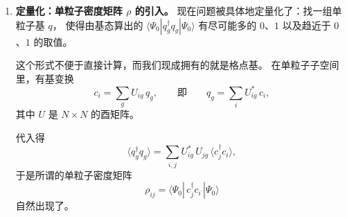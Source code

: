 \documentclass[11pt]{ctexart}
\begin{document}
\begin{enumerate}[leftmargin=2em, itemsep=0.8em]
\textbf{数值示例}：设 $N=4$ 格点、$M=2$ 个无自旋费米子，
在某个 $q$ 基下取归一化态
\[
|\psi\rangle
=a_1|1100\rangle+a_2|1010\rangle+a_3|1001\rangle
+a_4|0110\rangle+a_5|0101\rangle+a_6|0011\rangle ,
\]
其中 $|n_1 n_2 n_3 n_4\rangle$ 是 $q$ 构型（第 $g$ 位为 $n_g$）。
取
\[
|a_1|^2=|a_2|^2=0.49,\qquad
|a_3|^2=|a_4|^2=|a_5|^2=|a_6|^2=0.005 ,
\]
这满足归一化 $\sum_{i=1}^{6}|a_i|^2=1$。逐位计算平均占据数：
\[
\langle n_1\rangle=|a_1|^2+|a_2|^2+|a_3|^2=0.49+0.49+0.005=0.985 ,
\]
\[
\langle n_2\rangle=|a_1|^2+|a_4|^2+|a_5|^2=0.49+0.005+0.005=0.50 ,
\]
\[
\langle n_3\rangle=|a_2|^2+|a_4|^2+|a_6|^2=0.49+0.005+0.005=0.50 ,
\]
\[
\langle n_4\rangle=|a_3|^2+|a_5|^2+|a_6|^2=0.005+0.005+0.005=0.015 .
\]
四个值分别是“约 $1$、平庸、平庸、约 $0$”，正好覆盖三种情况。
（作为检验，$\langle n_1\rangle+\langle n_2\rangle+\langle n_3\rangle+\langle n_4\rangle=2$，
与总粒子数 $M=2$ 一致。）

据此决策：

第 $1$ 位 $\langle n_1\rangle=0.985\approx 1$：冻结为满，
扔掉第 $1$ 位为 $0$ 的构型
$\{|0110\rangle,|0101\rangle,|0011\rangle\}$，丢弃权重 $=1-0.985=0.015$。

第 $4$ 位 $\langle n_4\rangle=0.015\approx 0$：冻结为空，
扔掉第 $4$ 位为 $1$ 的构型
$\{|1001\rangle,|0101\rangle,|0011\rangle\}$，丢弃权重 $=0.015$。

第 $2$、$3$ 位 $\langle n_2\rangle=\langle n_3\rangle=0.50$：平庸值，
保留为活性轨道，不作冻结。

两个丢弃名单有重叠（$|0101\rangle,|0011\rangle$ 同时出现在两个名单里）。
取并集后，被丢弃的构型为
$\{|1001\rangle,|0110\rangle,|0101\rangle,|0011\rangle\}$，
总丢弃权重 $=0.02$。
保留下来的构型只有 $|1100\rangle$ 与 $|1010\rangle$ 两个，
于是 $|\psi\rangle$ 被近似为 2 维。
同时，冻结第 $1$ 位为满使粒子数从 $2$ 降为 $1$，
剩余活性轨道是第 $2$、$3$ 位，
其有效子空间恰为 $C_2^1=2$ 维，自洽。

\item \textbf{定量化：单粒子密度矩阵 $\rho$ 的引入。}
现在问题被具体地定量化了：找一组单粒子基 $q$，
使得由基态算出的 $\langle\Psi_0|q_g^{\dagger}q_g|\Psi_0\rangle$
有尽可能多的 $0$、$1$ 以及趋近于 $0$、$1$ 的取值。

这个形式不便于直接计算，而我们现成拥有的就是格点基。
在单粒子子空间里，有基变换
\[
c_i=\sum_g U_{ig}\,q_g ,
\qquad\text{即}\qquad
q_g=\sum_i U_{ig}^{*}\,c_i ,
\]
其中 $U$ 是 $N\times N$ 的酉矩阵。

代入得
\[
\langle q_g^{\dagger}q_g\rangle
=\sum_{i,j}U_{ig}^{*}\,U_{jg}\,\langle c_j^{\dagger}c_i\rangle ,
\]
于是所谓的单粒子密度矩阵
\[
\rho_{ij}=\langle\Psi_0|\,c_j^{\dagger}c_i\,|\Psi_0\rangle
\]
自然出现了。


\end{enumerate}
\end{document}
